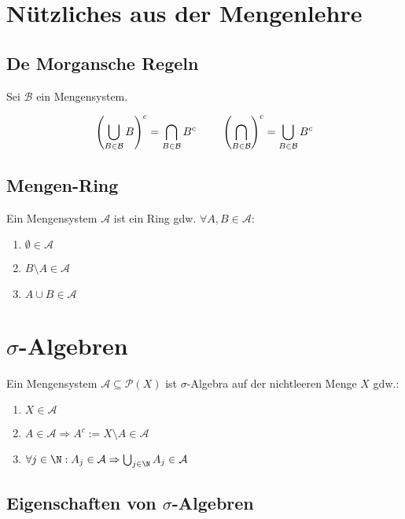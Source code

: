 \section*{Nützliches aus der Mengenlehre}

\subsection*{De Morgansche Regeln}

Sei $\mathcal{B}$ ein Mengensystem.

$$\left(\bigcup_{B\in \mathcal{B}} B \right)^c = \bigcap_{B\in \mathcal{B}} B^c \hspace*{8mm} \left(\bigcap_{B\in \mathcal{B}} \right)^c = \bigcup_{B\in \mathcal{B}} B^c$$

\subsection*{Mengen-Ring}

Ein Mengensystem $\mathcal{A}$ ist ein Ring gdw. $\forall A, B \in \mathcal{A}$:

\begin{enumerate}[label=(\alph*)]
	\item $\emptyset \in \mathcal{A}$
	\item $B\setminus A \in \mathcal{A}$
	\item $A \cup B \in \mathcal{A}$
\end{enumerate}

\section*{$\sigma$-Algebren}

Ein Mengensystem $\mathcal{A} \subseteq \mathcal{P}(X)$ ist $\sigma$-Algebra auf der nichtleeren Menge $X$ gdw.:

\begin{enumerate}[label=(\alph*)]
	\item $X \in \mathcal{A}$
	\item $A \in \mathcal{A} \Rightarrow A^c := X\setminus A \in \mathcal{A}$
	\item $\forall j \in \N : A_j \in \mathcal{A} \Rightarrow \bigcup_{j\in \N} A_j \in \mathcal{A}$
\end{enumerate}

\subsection*{Eigenschaften von $\sigma$-Algebren}

